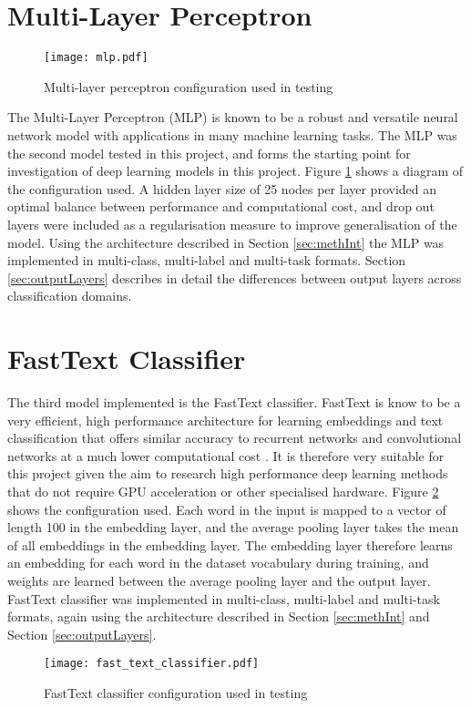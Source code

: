 \documentclass[Dissertation.tex]{subfiles}
\begin{document}
\section{Multi-Layer Perceptron}

\begin{figure}
	\centering
	\texttt{[image: mlp.pdf]}
	\caption{Multi-layer perceptron configuration used in testing}
	\label{fig:mlp}
\end{figure}
The Multi-Layer Perceptron (MLP) is known to be a robust and versatile neural network model \cite{castellaniCompetitiveCoevolutionMultilayer2018} with applications in many machine learning tasks. The MLP was the second model tested in this project, and forms the starting point for investigation of deep learning models in this project. Figure \ref{fig:mlp} shows a diagram of the configuration used. A hidden layer size of 25 nodes per layer provided an optimal balance between performance and computational cost, and drop out layers were included as a regularisation measure to improve generalisation of the model. Using the architecture described in Section \ref{sec:methInt} the MLP was implemented in multi-class, multi-label and multi-task formats. Section \ref{sec:outputLayers} describes in detail the differences between output layers across classification domains.

\section{FastText Classifier}\label{sec:fastTextMethod}
The third model implemented is the FastText classifier. FastText is know to be a very efficient, high performance architecture for learning embeddings and text classification that offers similar accuracy to recurrent networks and convolutional  networks at a much lower computational cost \cite{joulinBagTricksEfficient2016}. It is therefore very suitable for this project given the aim to research high performance deep learning methods that do not require GPU acceleration or other specialised hardware. Figure \ref{fig:fastTextClassifier} shows the configuration used. Each word in the input is mapped to a vector of length 100 in the embedding layer, and the average pooling layer takes the mean of all embeddings in the embedding layer. The embedding layer therefore learns an embedding for each word in the dataset vocabulary during training, and weights are learned between the average pooling layer and the output layer. FastText classifier was implemented in multi-class, multi-label and multi-task formats, again using the architecture described in Section \ref{sec:methInt} and Section \ref{sec:outputLayers}.

\begin{figure}\centering
	\texttt{[image: fast\_text\_classifier.pdf]}
	\caption{FastText classifier configuration used in testing}
	\label{fig:fastTextClassifier}
\end{figure}
\end{document}

